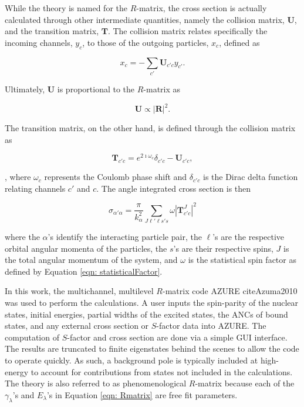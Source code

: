 While the theory is named for the $R$-matrix, the cross section is actually calculated through other intermediate quantities, namely the collision matrix, $\mathbf{U}$, and the transition matrix, $\mathbf{T}$. The collision matrix relates specifically the incoming channels, $y_{c}$, to those of the outgoing particles, $x_{c}$, defined as

\begin{equation}
x_{c} = - \sum_{c'} \mathbf{U}_{c' c} y_{c'}.
\end{equation}

\noindent Ultimately, $\mathbf{U}$ is proportional to the $R$-matrix as

\begin{equation}
\mathbf{U} \propto | \mathbf{R} |^{2}.
\end{equation}

\noindent The transition matrix, on the other hand, is defined through the collision matrix as 

\begin{equation}
\mathbf{T}_{c' c} = e^{2\imath \omega_{c}} \delta_{c' c} - \mathbf{U}_{c' c},
\end{equation}

\noindent, where $\omega_{c}$ represents the Coulomb phase shift and $\delta_{c' c}$ is the Dirac delta function relating channels $c'$ and $c$. The angle integrated cross section is then 

\begin{equation}
\sigma_{\alpha' \alpha} = \dfrac{\pi}{k_{\alpha}^{2}} \sum_{J \ell' \ell s' s} \omega | \mathbf{T}_{c' c}^{J} |^{2}
\end{equation}

\noindent where the $\alpha$'s identify the interacting particle pair, the $\ell$'s are the respective orbital angular momenta of the particles, the $s$'s are their respective spins, $J$ is the total angular momentum of the system, and $\omega$ is the statistical spin factor as defined by Equation \ref{eqn: statisticalFactor}. 

In this work, the multichannel, multilevel $R$-matrix code AZURE cite{Azuma2010} was used to perform the calculations. A user inputs the spin-parity of the nuclear states, initial energies, partial widths of the excited states, the ANCs of bound states, and any external cross section or $S$-factor data into AZURE. The computation of $S$-factor and cross section are done via a simple GUI interface. The results are truncated to finite eigenstates behind the scenes to allow the code to operate quickly. As such, a background pole is typically included at high-energy to account for contributions from states not included in the calculations. The theory is also referred to as phenomenological $R$-matrix because each of the $\gamma_{\lambda}$'s and $E_{\lambda}$'s in Equation \ref{eqn: Rmatrix} are free fit parameters. 






